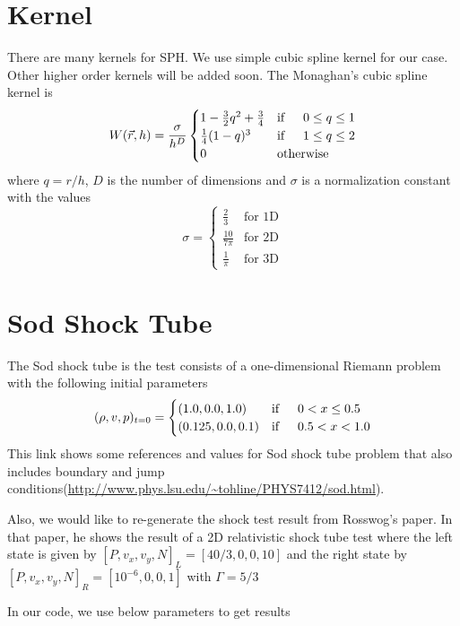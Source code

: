 \documentclass{article}
\begin{document}
\section{Kernel}
There are many kernels for SPH. We use simple cubic spline kernel for our case. Other higher order kernels will be added soon. The Monaghan's cubic spline kernel is
\begin{equation}
W(\vec{r},h) = \frac{\sigma}{h^D} \begin{cases}
1-\frac{3}{2} q^2 + \frac{3}{4} & \text{if} \indent 0 \leq q \leq 1 \\
\frac{1}{4} (1-q)^3  & \text{if} \indent 1 \leq q \leq 2 \\
0 & \text{otherwise}
\end{cases}
\end{equation}
where $q = r/h$, $D$ is the number of dimensions and $\sigma$ is a normalization constant with the values
\begin{equation}
\sigma =  \begin{cases}
\frac{2}{3} & \text{for 1D}  \\
\frac{10}{7 \pi} & \text{for 2D} \\
\frac{1}{\pi} & \text{for 3D}
\end{cases}
\end{equation}
\section{Sod Shock Tube}
The Sod shock tube is the test consists of a one-dimensional Riemann problem with the following initial parameters
\begin{equation}
(\rho, v, p)_{t=0} = \begin{cases}
(1.0,0.0,1.0) & \text{if} \indent 0 < x \leq 0.5 \\
(0.125,0.0,0.1) & \text{if} \indent 0.5 < x < 1.0
\end{cases}
\end{equation}
This link shows some references and values for Sod shock tube problem that also includes boundary and jump conditions(\url{http://www.phys.lsu.edu/~tohline/PHYS7412/sod.html}).

Also, we would like to re-generate the shock test result from Rosswog's paper. In that paper, he shows the result of a 2D relativistic shock tube test where the left state is given by $[P, v_x, v_y, N]_L = [40/3,0,0,10]$ and the right state by $[P, v_x, v_y, N]_R = [10^{-6},0,0,1]$ with $\Gamma = 5/3$

In our code, we use below parameters to get results
\end{document}
